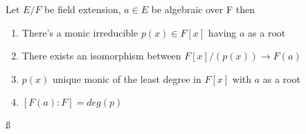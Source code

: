 \begin{theorem}
	Let \(E/F\) be field extension, \(a \in E\)  be algebraic over F
	then \begin{enumerate}
		\item There's a monic irreducible \(p(x) \in F[x]\) having \(a\) as a root
		\item There exists an isomorphism between \(F[x]/(p(x)) \to F(a)\)
		\item \(p(x)\) unique monic of the least degree in \(F[x]\) with \(a\) as a root
		\item \([F(a):F] = deg(p)\)    
	\end{enumerate}
\end{theorem} 
ß



